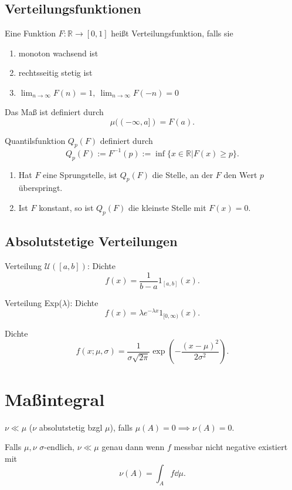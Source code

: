 \documentclass[prb,12pt, twocolumn]{revtex4-2}
\theoremstyle{definition}
\theoremstyle{definition}
\theoremstyle{definition}
\newcommand{\R}{\mathbb{R}}
\begin{document}
\subsection{Verteilungsfunktionen}
\begin{Note}[Verteilungsfunktion]
	Eine Funktion $F:\R\to[0,1]$ heißt Verteilungsfunktion, falls sie
	\begin{enumerate}
		\item monoton wachsend ist
		\item rechtsseitig stetig ist
		\item $\lim_{n \to \infty} F(n)=1,~\lim_{n \to \infty} F(-n)=0$
	\end{enumerate}
	Das Maß ist definiert durch
	\[
		\mu((-\infty, a]) = F(a)
	.\] 
\end{Note}
\begin{Note}
	Quantilsfunktion $Q_p(F)$ definiert durch
	\[
		Q_p(F) := F^{-1}(p) := \inf \{x\in \R|F(x) \ge p\} 
	.\] 
	\begin{enumerate}
		\item Hat $F$ eine Sprungstelle, ist $Q_p(F)$ die Stelle, an der $F$ den Wert $p$ \"{u}berspringt.
		\item Ist $F$ konstant, so ist $Q_p(F)$ die kleinste Stelle mit $F(x) =0$.
	\end{enumerate}
\end{Note}
\subsection{Absolutstetige Verteilungen}
\begin{Note}
	Verteilung $\mathcal{U}([a,b])$: Dichte
	\[
		f(x) = \frac{1}{b-a}1_{[a,b]}(x)
	.\] 
\end{Note}
\begin{Note}[Exponentialverteilung]
	Verteilung Exp($\lambda$): Dichte
	\[
		f(x) = \lambda e^{-\lambda x}1_{[0,\infty)}(x)
	.\] 
\end{Note}
\begin{Note}[Normalverteilung]
	Dichte
	\[
	f(x;\mu, \sigma) = \frac{1}{\sigma \sqrt{2\pi} }\exp\left( -\frac{(x-\mu)^2}{2\sigma^2} \right) 
	.\] 
\end{Note}
\section{Maßintegral}
\begin{Note}[Absolutstetig]
	$\nu \ll \mu$ ($\nu$ absolutstetig bzgl $\mu$), falls $\mu(A)=0\implies \nu(A)=0$.
\end{Note}
\begin{Note}
	Falls $\mu,\nu$ $\sigma$-endlich, $\nu\ll \mu$ genau dann wenn $f$ messbar nicht negative existiert mit
\[
	\nu(A) = \int_A f\dd{\mu}
.\] 
\end{Note}
\end{document}

